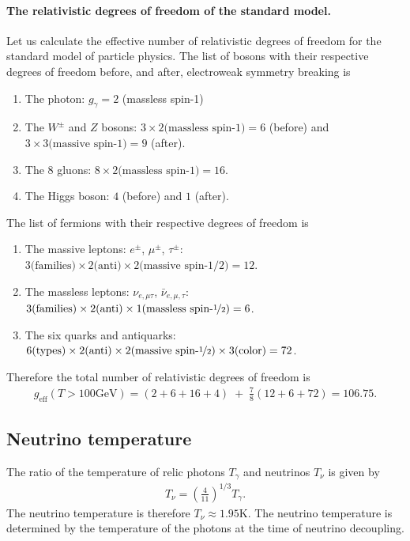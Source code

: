 \documentclass[a4paper]{article}
\begin{document}
\paragraph{The relativistic degrees of freedom of the standard model.} Let us calculate the effective number of relativistic degrees of freedom for the standard model of particle physics. The list of bosons with their respective degrees of freedom before, and after, electroweak symmetry breaking is
\begin{enumerate}
  \item The photon: $g_\gamma=2$ (massless spin-1) 
  \item The $W^\pm$ and $Z$ bosons: $3\times2\text{(massless spin-1)}=6$ (before) and $3\times3\text{(massive spin-1)}=9$ (after).
  \item The 8 gluons: $8\times 2\text{(massless spin-1)}=16$.
  \item The Higgs boson: $4$ (before) and $1$ (after).
\end{enumerate}
The list of fermions with their respective degrees of freedom is
\begin{enumerate}
  \item The massive leptons: $e^\pm$, $\mu^\pm$, $\tau^\pm$: $3\text{(families)}\times2\text{(anti)}\times2\text{(massive spin-1/2)}=12$.
  \item The massless leptons: $\nu_{e,\mu\tau}$, $\bar{\nu}_{e,\mu,\tau}$: $3\text{(families)}\times 2\text{(anti)}\times 1\text{(massless spin-\nicefrac{1}{2})}=6$.
  \item The six quarks and antiquarks: $6\text{(types)}\times2\text{(anti)}\times2\text{(massive spin-\nicefrac{1}{2})}\times3\text{(color)}=72$.
\end{enumerate}
Therefore the total number of relativistic degrees of freedom is
\begin{align}
  g_\text{eff}(T>100 \text{GeV}) = \left(2+6+16+4\right)\;+\; \frac{7}{8}\left(12+6+72\right) = 106.75.
\end{align}

\subsection{Neutrino temperature}
The ratio of the temperature of relic photons $T_\gamma$ and neutrinos $T_\nu$ is given by
\begin{align}
  T_\nu = \left(\frac{4}{11}\right)^{1/3}T_\gamma.
\end{align}
The neutrino temperature is therefore $T_\nu\approx1.95$K. The neutrino temperature is determined by the temperature of the photons at the time of neutrino decoupling. 
\end{document}
